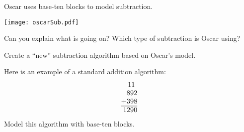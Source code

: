 \documentclass{ximera}
\begin{document}
\newpage
\begin{problem}
Oscar uses base-ten blocks to model subtraction.  
\begin{image}
\texttt{[image: oscarSub.pdf]}
\end{image}
Can you explain what is going on?  Which type of subtraction is Oscar using?  
\end{problem}

\begin{problem} Create a ``new'' subtraction algorithm based on Oscar's model.
\end{problem}

\newpage
\begin{problem}
Here is an example of a standard addition algorithm:
\[
\normalfont
\begin{tabular}{@{}r@{}}
11~~\\
892\\
+398\\ \hline
1290
\end{tabular}
\]
Model this algorithm with base-ten blocks.
\end{problem}
\end{document}
